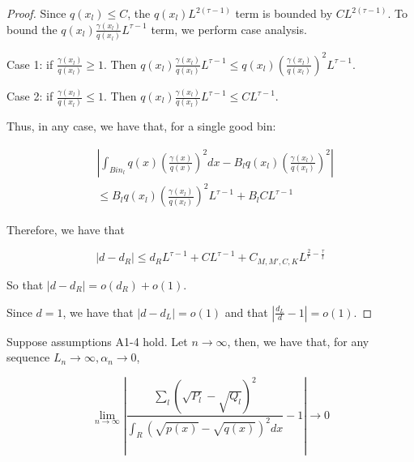\begin{proof}
Since $q(x_l) \leq C$, the $q(x_l) L^{2(\tau-1)}$ term is bounded by $C L^{2(\tau - 1)}$. To bound the $q(x_l) \frac{\gamma(x_l)}{q(x_l)} L^{\tau-1} $ term, we perform case analysis.

Case 1: if $\frac{\gamma(x_l)}{q(x_l)} \geq 1$. Then $q(x_l) \frac{\gamma(x_l)}{q(x_l)} L^{\tau-1} \leq q(x_l) \left(\frac{\gamma(x_l)}{q(x_l)} \right)^2 L^{\tau-1}$. 

Case 2: if $\frac{\gamma(x_l)}{q(x_l)} \leq 1$. Then $q(x_l) \frac{\gamma(x_l)}{q(x_l)} L^{\tau-1} \leq C L^{\tau-1}$. 

Thus, in any case, we have that, for a single good bin:


\begin{align*}
& \left| \int_{Bin_l} q(x) \left( \frac{\gamma(x)}{q(x)} \right)^2 dx - 
      B_l q(x_l) \left( \frac{\gamma(x_l)}{q(x_l)} \right)^2 \right| \\
& \leq   B_l q(x_l) \left( \frac{\gamma(x_l)}{q(x_l)} \right)^2 L^{\tau-1} +
      B_l C L^{\tau-1} 
\end{align*}

Therefore, we have that

\[
|d - d_R | \leq d_R L^{\tau-1} + C L^{\tau-1} + C_{M, M', C, K} L^{\frac{2}{r} - \frac{\tau}{t}}
\]

So that $|d - d_R| = o(d_R) + o(1)$. 

Since $d = 1$, we have that $|d - d_L| = o(1)$ and that $\left| \frac{d_L}{d} - 1 \right| = o(1)$. 

\end{proof}



\begin{proposition}
\label{prop:H_HL_convergence_R}
Suppose assumptions A1-4 hold. Let $n \rightarrow \infty$, then, we have that, for any sequence $L_n \rightarrow \infty, \alpha_n \rightarrow 0$,

\[
\lim_{n \rightarrow \infty} \left| \frac{\sum_l (\sqrt{P_l} - \sqrt{Q_l})^2}{\int_R (\sqrt{p(x)} - \sqrt{q(x)})^2 dx} 
        - 1 \right| \rightarrow 0
\]

\end{proposition}

